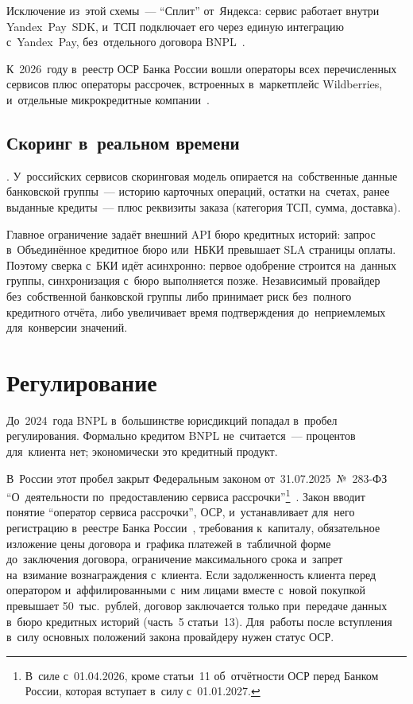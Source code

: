 Исключение из~этой схемы~--- \enquote{Сплит} от~Яндекса: сервис работает внутри
Yandex~Pay~SDK, и~ТСП подключает его через единую интеграцию с~Yandex~Pay,
без~отдельного договора BNPL~\cite{yandex-split}.

К~2026~году в~реестр ОСР Банка России вошли операторы всех перечисленных
сервисов плюс операторы рассрочек, встроенных в~маркетплейс Wildberries,
и~отдельные микрокредитные компании~\cite{cbr-osr-registry-2026}.

\subsection*{Скоринг в~реальном времени}

. У~российских сервисов скоринговая модель опирается
на~собственные данные банковской группы~--- историю карточных операций, остатки
на~счетах, ранее выданные кредиты~--- плюс реквизиты заказа (категория ТСП,
сумма, доставка).

Главное ограничение задаёт внешний API бюро кредитных историй: запрос
в~Объединённое кредитное бюро или~НБКИ превышает SLA страницы оплаты. Поэтому
сверка с~БКИ идёт асинхронно: первое одобрение строится на~данных группы,
синхронизация с~бюро выполняется позже. Независимый провайдер без~собственной
банковской группы либо принимает риск без~полного кредитного отчёта, либо
увеличивает время подтверждения до~неприемлемых для~конверсии значений.

\section{Регулирование}\label{sec:bnpl-regulation}

До~2024~года BNPL в~большинстве юрисдикций попадал в~пробел регулирования.
Формально кредитом BNPL не~считается~--- процентов для~клиента нет;
экономически это кредитный продукт.

В~России этот пробел закрыт Федеральным законом от~31.07.2025~№~283-ФЗ
\enquote{О~деятельности по~предоставлению сервиса рассрочки}\footnote{В~силе с~01.04.2026, кроме статьи~11
об~отчётности ОСР перед Банком России, которая вступает в~силу с~01.01.2027.}~\cite{fz-283}. Закон вводит понятие
\enquote{оператор сервиса рассрочки}, ОСР, и~устанавливает для~него
регистрацию в~реестре Банка России~\cite{cbr-osr}, требования к~капиталу, обязательное изложение цены договора и~графика
платежей в~табличной форме до~заключения договора, ограничение максимального
срока и~запрет на~взимание вознаграждения с~клиента. Если задолженность
клиента перед оператором и~аффилированными с~ним лицами вместе с~новой
покупкой превышает 50~тыс.\ рублей, договор заключается только при~передаче
данных в~бюро кредитных историй (часть~5 статьи~13).
Для~работы после вступления в~силу основных положений закона провайдеру нужен
статус ОСР.

